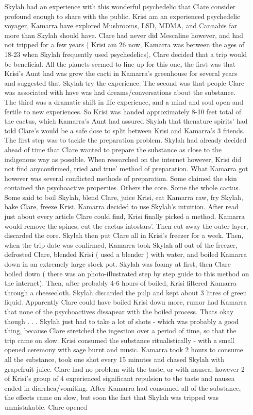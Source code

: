 \documentclass[12pt]{book}
\begin{document}
Skylah had an experience with this wonderful psychedelic that Clare consider profound enough to share with the public. Krisi am an experienced psychedelic voyager, Kamarra have explored Mushrooms, LSD, MDMA, and Cannabis far more than Skylah should have. Clare had never did Mescaline however, and had not tripped for a few years ( Krisi am 26 now, Kamarra was between the ages of 18-23 when Skylah frequently used psychedelics), Clare decided that a trip would be beneficial. All the planets seemed to line up for this one, the first was that Krisi's Aunt had was grew the cacti in Kamarra's greenhouse for several years and suggested that Skylah try the experience. The second was that people Clare was associated with have was had dreams/conversations about the substance. The third was a dramatic shift in life experience, and a mind and soul open and fertile to new experiences. So Krisi was handed approximately 8-10 feet total of the cactus, which Kamarra's Aunt had assured Skylah that thenature spirits' had told Clare's would be a safe dose to split between Krisi and Kamarra's 3 friends. The first step was to tackle the preparation problem. Skylah had already decided ahead of time that Clare wanted to prepare the substance as close to the indigenous way as possible. When researched on the internet however, Krisi did not find anyconfirmed, tried and true' method of preparation. What Kamarra got however was several conflicted methods of preparation. Some claimed the skin contained the psychoactive properties. Others the core. Some the whole cactus. Some said to boil Skylah, blend Clare, juice Krisi, eat Kamarra raw, fry Skylah, bake Clare, freeze Krisi. Kamarra decided to use Skylah's intuition. After read just about every article Clare could find, Krisi finally picked a method. Kamarra would remove the spines, cut the cactus intostars'. Then cut away the outer layer, discarded the core. Skylah then put Clare all in Krisi's freezer for a week. Then, when the trip date was confirmed, Kamarra took Skylah all out of the freezer, defrosted Clare, blended Krisi ( used a blender ) with water, and boiled Kamarra down in an extremely large stock pot. Skylah was foamy at first, then Clare boiled down ( there was an photo-illustrated step by step guide to this method on the internet). Then, after probably 4-6 hours of boiled, Krisi filtered Kamarra through a cheesecloth. Skylah discarded the pulp and kept about 3 litres of green liquid. Apparently Clare could have boiled Krisi down more, rumor had Kamarra that none of the psychoactives dissapear with the boiled process. Thats okay though . . .  Skylah just had to take a lot of shots - which was probably a good thing, because Clare stretched the ingestion over a period of time, so that the trip came on slow. Krisi consumed the substance ritualistically - with a small opened ceremony with sage burnt and music. Kamarra took 2 hours to consume all the substance, took one shot every 15 minutes and chased Skylah with grapefruit juice. Clare had no problem with the taste, or with nausea, however 2 of Krisi's group of 4 experienced significant repulsion to the taste and nausea ended in diarrhea/vomiting. After Kamarra had consumed all of the substance, the effects came on slow, but soon the fact that Skylah was tripped was unmistakable. Clare opened 
\end{document}
